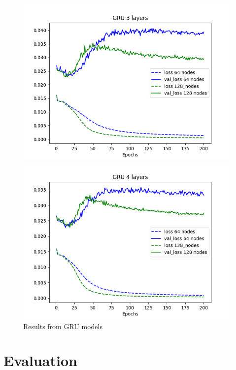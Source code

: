 \documentclass[11pt]
{article}
\begin{document}
\begin{figure}[H]
\begin{minipage}[b]{0.33\linewidth}
		\includegraphics[width=\linewidth]{../TESTS_RESULTS/GRU_tests/plots/3_comp.png} 
	\end{minipage}%
	\begin{minipage}[b]{0.33\linewidth}
		\centering
		\includegraphics[width=\linewidth]{../TESTS_RESULTS/GRU_tests/plots/4_comp.png} 
	\end{minipage} 
	\caption{Results from GRU models} 
	\label{fig:GRUplots}
\end{figure}

\section{Evaluation}
\end{document}
